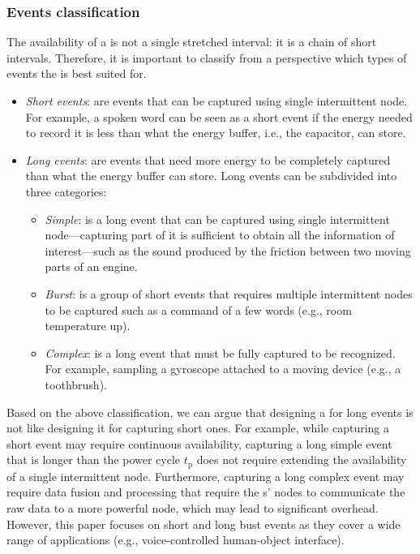 \subsubsection{Events classification}
\label{sec:event_classification}
The availability of a \cis is not a single stretched interval: it is a chain of short intervals. Therefore, it is important to classify from a \cis perspective which types of events the \cis is best suited for. 
%
\begin{itemize}[leftmargin=*]
\item \textit{Short events}: are events that can be captured using single intermittent node. For example, a spoken word can be seen as a short event if the energy needed to record it is less than what the energy buffer, i.e., the capacitor, can store.
\item \textit{Long events}: are events that need more energy to be completely captured than what the energy buffer can store. Long events can be subdivided into three categories: 
	\begin{itemize}
		\item \textit{Simple}: is a long event that can be captured
		using single intermittent node---capturing part of it is
		sufficient to obtain all the information of interest---such as
		the sound produced by the friction between two moving parts of
		an engine.%
		\item \textit{Burst}: is a group of short events that requires multiple intermittent nodes to be captured such as a command of a few words (e.g., room temperature up).
		\item \textit{Complex}: is a long event that must be fully captured to be recognized. For example, sampling a gyroscope attached to a moving device (e.g., a toothbrush).

	\end{itemize}
\end{itemize}
%
Based on the above classification, we can argue that designing a \cis for long events is not like designing it for capturing short ones. For example, while capturing a short event may require continuous \cis availability, capturing a long simple event that is longer than the power cycle $t_\text{p}$ does not require extending the availability of a single intermittent node. Furthermore, capturing a long complex event may require data fusion and processing that require the \cis{}s' nodes to communicate the raw data to a more powerful node, which may lead to significant overhead. However, this paper focuses on short and long bust events as they cover a wide range of applications (e.g., voice-controlled human-object interface). 

